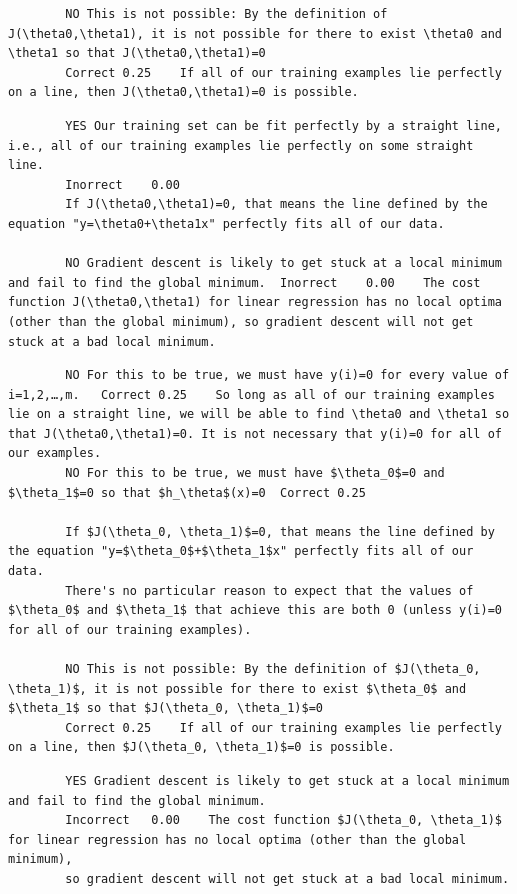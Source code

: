 		\begin{verbatim}
		NO This is not possible: By the definition of J(\theta0,\theta1), it is not possible for there to exist \theta0 and \theta1 so that J(\theta0,\theta1)=0	
		Correct	0.25	If all of our training examples lie perfectly on a line, then J(\theta0,\theta1)=0 is possible.
		\end{verbatim}
		
		\begin{verbatim}
		YES Our training set can be fit perfectly by a straight line, i.e., all of our training examples lie perfectly on some straight line.	
		Inorrect	0.00	
		If J(\theta0,\theta1)=0, that means the line defined by the equation "y=\theta0+\theta1x" perfectly fits all of our data.
		
		NO Gradient descent is likely to get stuck at a local minimum and fail to find the global minimum.	Inorrect	0.00	The cost function J(\theta0,\theta1) for linear regression has no local optima (other than the global minimum), so gradient descent will not get stuck at a bad local minimum.
		\end{verbatim}
		
		\begin{verbatim}
		NO For this to be true, we must have y(i)=0 for every value of i=1,2,…,m.	Correct	0.25	So long as all of our training examples lie on a straight line, we will be able to find \theta0 and \theta1 so that J(\theta0,\theta1)=0. It is not necessary that y(i)=0 for all of our examples.
		NO For this to be true, we must have $\theta_0$=0 and $\theta_1$=0 so that $h_\theta$(x)=0	Correct	0.25	
		
		If $J(\theta_0, \theta_1)$=0, that means the line defined by the equation "y=$\theta_0$+$\theta_1$x" perfectly fits all of our data. 
		There's no particular reason to expect that the values of $\theta_0$ and $\theta_1$ that achieve this are both 0 (unless y(i)=0 for all of our training examples).
		
		NO This is not possible: By the definition of $J(\theta_0, \theta_1)$, it is not possible for there to exist $\theta_0$ and $\theta_1$ so that $J(\theta_0, \theta_1)$=0	
		Correct	0.25	If all of our training examples lie perfectly on a line, then $J(\theta_0, \theta_1)$=0 is possible.
		\end{verbatim}
		
		\begin{verbatim}
		YES Gradient descent is likely to get stuck at a local minimum and fail to find the global minimum.	
		Incorrect	0.00	The cost function $J(\theta_0, \theta_1)$ for linear regression has no local optima (other than the global minimum), 
		so gradient descent will not get stuck at a bad local minimum.
		\end{verbatim}
		
